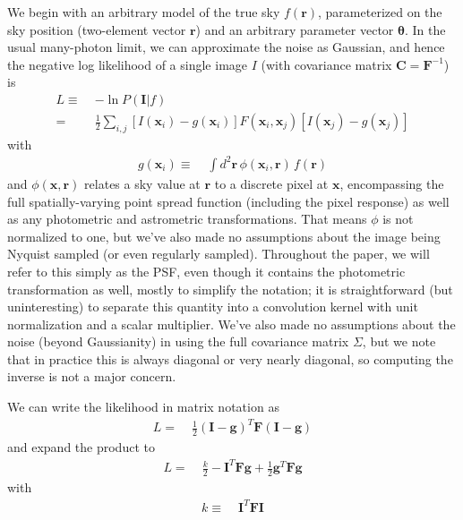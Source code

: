 \documentclass[10pt]{article}
\begin{document}
We begin with an arbitrary model of the true sky $f(\bm{r})$, parameterized on the sky position (two-element vector $\bm{r}$) and an arbitrary parameter vector $\bm{\theta}$.  In the usual many-photon limit, we can approximate the noise as Gaussian, and hence the negative log likelihood of a single image $I$ (with covariance matrix $\bm{C}=\bm{F}^{-1}$) is
\begin{align}
    L \equiv\;& -\ln P(\bm{I}|f) \\
    =\;& \frac{1}{2} \sum_{i,j}
        \left[I(\bm{x}_i) - g(\bm{x}_i)\right]
        F(\bm{x}_i,\bm{x}_j)
        \left[I(\bm{x}_j) - g(\bm{x}_j)\right]
    \label{eqn:original-likelihood}
\end{align}
with
\begin{align}
g(\bm{x}_i) \equiv\;&
    \int\! d^2 \bm{r} \, \phi(\bm{x}_i,\bm{r}) \, f(\bm{r})
    \label{eqn:convolved-model-def}
\end{align}
and $\phi(\bm{x},\bm{r})$ relates a sky value at $\bm{r}$ to a discrete pixel at $\bm{x}$, encompassing the full spatially-varying point spread function (including the pixel response) as well as any photometric and astrometric transformations.  That means $\phi$ is not normalized to one, but we've also made no assumptions about the image being Nyquist sampled (or even regularly sampled).  Throughout the paper, we will refer to this simply as the PSF, even though it contains the photometric transformation as well, mostly to simplify the notation; it is straightforward (but uninteresting) to separate this quantity into a convolution kernel with unit normalization and a scalar multiplier.  We've also made no assumptions about the noise (beyond Gaussianity) in using the full covariance matrix $\Sigma$, but we note that in practice this is always diagonal or very nearly diagonal, so computing the inverse is not a major concern.

We can write the likelihood in matrix notation as
\begin{align}
L =\;& \frac{1}{2}
        \left(\bm{I} - \bm{g}\right)^T\!
        \bm{F}
        \left(\bm{I} - \bm{g}\right)
\end{align}
and expand the product to
\begin{align}
L =\;& \frac{k}{2} - \bm{I}^T\!\bm{F}\bm{g}
        + \frac{1}{2}\bm{g}^T\!\bm{F}\bm{g}
        \label{eqn:expanded-likelihood}
\end{align}
with
\begin{align}
k \equiv\;&
    \bm{I}^T\!\bm{F} \bm{I}
    \label{eqn:k-def}
\end{align}
\end{document}
